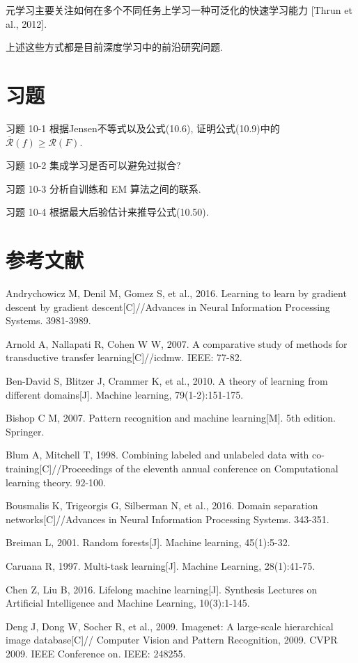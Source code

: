\documentclass[10pt]{article}
\begin{document}
元学习主要关注如何在多个不同任务上学习一种可泛化的快速学习能力 [Thrun et al., 2012].

上述这些方式都是目前深度学习中的前沿研究问题.

\section*{习题}
习题 10-1 根据Jensen不等式以及公式(10.6), 证明公式(10.9)中的 $\overline{\mathcal{R}}(f) \geq \mathcal{R}(F)$.

习题 10-2 集成学习是否可以避免过拟合?

习题 10-3 分析自训练和 EM 算法之间的联系.

习题 10-4 根据最大后验估计来推导公式(10.50).

\section*{参考文献}
Andrychowicz M, Denil M, Gomez S, et al., 2016. Learning to learn by gradient descent by gradient descent[C]//Advances in Neural Information Processing Systems. 3981-3989.

Arnold A, Nallapati R, Cohen W W, 2007. A comparative study of methods for transductive transfer learning[C]//icdmw. IEEE: 77-82.

Ben-David S, Blitzer J, Crammer K, et al., 2010. A theory of learning from different domains[J]. Machine learning, 79(1-2):151-175.

Bishop C M, 2007. Pattern recognition and machine learning[M]. 5th edition. Springer.

Blum A, Mitchell T, 1998. Combining labeled and unlabeled data with co-training[C]//Proceedings of the eleventh annual conference on Computational learning theory. 92-100.

Bousmalis K, Trigeorgis G, Silberman N, et al., 2016. Domain separation networks[C]//Advances in Neural Information Processing Systems. 343-351.

Breiman L, 2001. Random forests[J]. Machine learning, 45(1):5-32.

Caruana R, 1997. Multi-task learning[J]. Machine Learning, 28(1):41-75.

Chen Z, Liu B, 2016. Lifelong machine learning[J]. Synthesis Lectures on Artificial Intelligence and Machine Learning, 10(3):1-145.

Deng J, Dong W, Socher R, et al., 2009. Imagenet: A large-scale hierarchical image database[C]// Computer Vision and Pattern Recognition, 2009. CVPR 2009. IEEE Conference on. IEEE: 248255.
\end{document}
